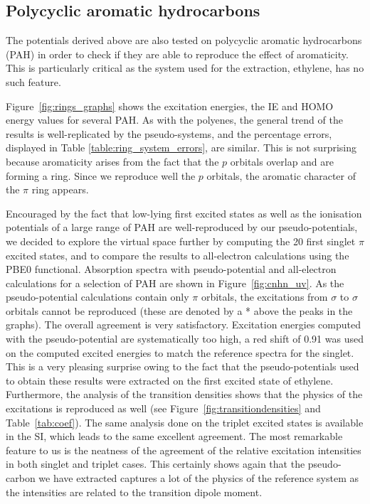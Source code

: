\documentclass[12pt]{article}
\begin{document}
\subsection*{\sffamily \large Polycyclic aromatic hydrocarbons}

The potentials derived above are also tested on polycyclic aromatic hydrocarbons (PAH)
in order to check if they are able to reproduce the effect of aromaticity.
This is particularly critical as the system used for the extraction, ethylene, has no such feature.

Figure~\ref{fig:rings_graphs} shows the excitation energies, the IE and
HOMO energy values for several PAH.
As with the polyenes, the general trend of the results is well-replicated
by the pseudo-systems, and the percentage errors, displayed in Table
\ref{table:ring_system_errors}, are similar.
This is not surprising because aromaticity arises from the fact that
the $p$ orbitals overlap and are forming a ring.
Since we reproduce well the $p$ orbitals, the aromatic character of the $\pi$ ring
appears.

Encouraged by the fact that low-lying first excited states as well as the ionisation potentials of a large range of PAH are well-reproduced by our pseudo-potentials,
we decided to explore the virtual space further by computing the 20 first singlet
$\pi$ excited states, and to compare the results to all-electron calculations using the PBE0 functional.
Absorption spectra with pseudo-potential and all-electron
calculations for a selection of PAH are shown in Figure~\ref{fig:cnhn_uv}.
As the pseudo-potential calculations contain only $\pi$ orbitals, the excitations from $\sigma$ to $\sigma$ orbitals cannot be reproduced 
(these are denoted by a * above the peaks in the graphs).
The overall agreement is very satisfactory.
Excitation energies computed with the pseudo-potential are systematically too high, a red shift of
0.91 was used on the computed excited energies to match the reference spectra for the singlet.
This is a very pleasing surprise owing to the fact that the pseudo-potentials used
to obtain these results were extracted on the first excited state of ethylene.
Furthermore, the analysis of the transition densities shows that the physics of the excitations
is reproduced as well (see Figure~\ref{fig:transitiondensities} and Table~\ref{tab:coef}).
The same analysis done on the triplet excited states is available in the SI, which leads to the same
excellent agreement.
The most remarkable feature to us is the neatness of the agreement of the relative excitation intensities in both singlet and triplet cases.
This certainly shows again that the pseudo-carbon we have extracted captures a lot of the physics of the reference system as the intensities are related to the transition dipole moment.
\end{document}
